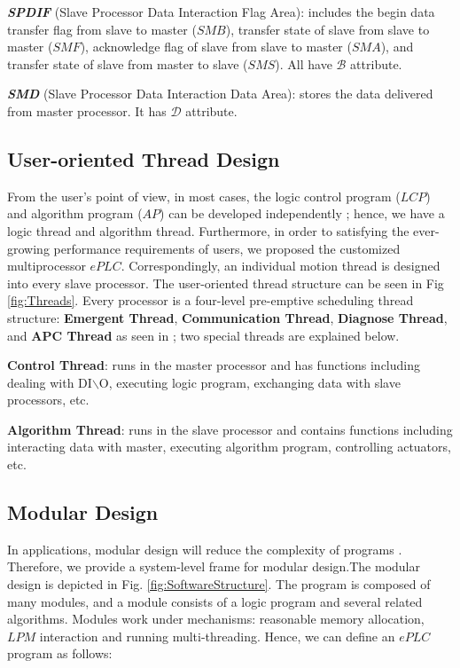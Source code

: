 \documentclass[journal,UTF8]{IEEEtran}
\begin{document}
\textbf{\emph{SPDIF}} (Slave Processor Data Interaction Flag Area): includes the begin data transfer flag from slave to master ($SMB$), transfer state of slave from slave to master ($SMF$), acknowledge flag of slave from slave to master ($SMA$), and transfer state of slave from master to slave ($SMS$). All have $\mathcal{B}$ attribute.

\textbf{\emph{SMD}} (Slave Processor Data Interaction Data Area): stores the data delivered from master processor. It has $\mathcal{D}$ attribute.

\subsection{User-oriented Thread Design}
From the user's point of view, in most cases, the logic control program ($LCP$) and algorithm program ($AP$) can be developed independently \cite{WuA}; hence, we have a logic thread and algorithm thread. Furthermore, in order to satisfying the ever-growing performance requirements of users, we proposed the customized multiprocessor $ePLC$. Correspondingly, an individual motion thread is designed into every slave processor. The user-oriented thread structure can be seen in Fig \ref{fig:Threads}. Every processor is a four-level pre-emptive scheduling thread structure: \textbf{Emergent Thread}, \textbf{Communication Thread}, \textbf{Diagnose Thread}, and \textbf{APC Thread} as seen in \cite{WuA}; two special threads are explained below.

\textbf{Control Thread}: runs in the master processor and has functions including dealing with DI$\backslash$O, executing logic program, exchanging data with slave processors, etc.

\textbf{Algorithm Thread}: runs in the slave processor and contains functions including interacting data with master, executing algorithm program, controlling actuators, etc.

\subsection{Modular Design}  
In applications, modular design will reduce the complexity of programs \cite{Vyatkin2013Software}. Therefore, we provide a system-level frame for modular design.The modular design is depicted in Fig. \ref{fig:SoftwareStructure}. The program is composed of many modules, and a module consists of a logic program and several related algorithms. Modules work under mechanisms: reasonable memory allocation, $LPM$ interaction and running multi-threading. Hence, we can define an $ePLC$ program as follows:
\end{document}
